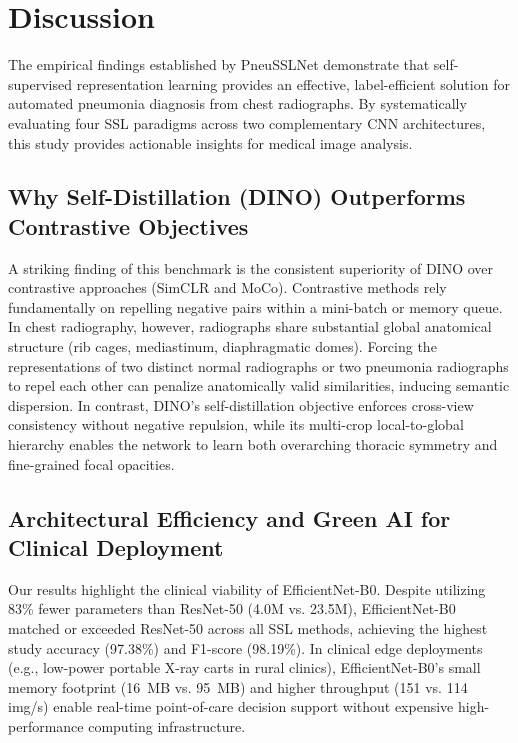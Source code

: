 \documentclass[journal,article,submit,moreauthors,pdftex]{Definitions/tsp}
\begin{document}
\section{Discussion} \label{sect:s5}

The empirical findings established by PneuSSLNet demonstrate that self-supervised representation learning provides an effective, label-efficient solution for automated pneumonia diagnosis from chest radiographs. By systematically evaluating four SSL paradigms across two complementary CNN architectures, this study provides actionable insights for medical image analysis.

\subsection{Why Self-Distillation (DINO) Outperforms Contrastive Objectives}
A striking finding of this benchmark is the consistent superiority of DINO over contrastive approaches (SimCLR and MoCo). Contrastive methods rely fundamentally on repelling negative pairs within a mini-batch or memory queue. In chest radiography, however, radiographs share substantial global anatomical structure (rib cages, mediastinum, diaphragmatic domes). Forcing the representations of two distinct normal radiographs or two pneumonia radiographs to repel each other can penalize anatomically valid similarities, inducing semantic dispersion. In contrast, DINO's self-distillation objective enforces cross-view consistency without negative repulsion, while its multi-crop local-to-global hierarchy enables the network to learn both overarching thoracic symmetry and fine-grained focal opacities.

\subsection{Architectural Efficiency and Green AI for Clinical Deployment}
Our results highlight the clinical viability of EfficientNet-B0. Despite utilizing 83\% fewer parameters than ResNet-50 (4.0M vs. 23.5M), EfficientNet-B0 matched or exceeded ResNet-50 across all SSL methods, achieving the highest study accuracy (97.38\%) and F1-score (98.19\%). In clinical edge deployments (e.g., low-power portable X-ray carts in rural clinics), EfficientNet-B0's small memory footprint (16~MB vs. 95~MB) and higher throughput (151 vs. 114 img/s) enable real-time point-of-care decision support without expensive high-performance computing infrastructure.
\end{document}

